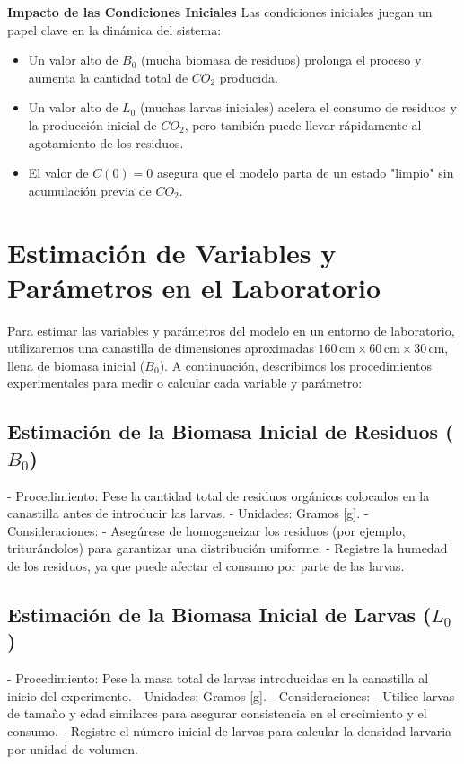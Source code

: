 \documentclass[12pt]{article}
\begin{document}
\textbf{Impacto de las Condiciones Iniciales}
Las condiciones iniciales juegan un papel clave en la dinámica del sistema:
\begin{itemize}
    \item Un valor alto de $B_0$ (mucha biomasa de residuos) prolonga el proceso y aumenta la cantidad total de $CO_2$ producida.
    \item Un valor alto de $L_0$ (muchas larvas iniciales) acelera el consumo de residuos y la producción inicial de $CO_2$, pero también puede llevar rápidamente al agotamiento de los residuos.
    \item El valor de $C(0) = 0$ asegura que el modelo parta de un estado "limpio" sin acumulación previa de $CO_2$.
\end{itemize}

\section{Estimación de Variables y Parámetros en el Laboratorio}

Para estimar las variables y parámetros del modelo en un entorno de laboratorio, utilizaremos una canastilla de dimensiones aproximadas $160 \, \text{cm} \times 60 \, \text{cm} \times 30 \, \text{cm}$, llena de biomasa inicial ($B_0$). A continuación, describimos los procedimientos experimentales para medir o calcular cada variable y parámetro:

\subsection{Estimación de la Biomasa Inicial de Residuos ($B_0$)}
- Procedimiento: Pese la cantidad total de residuos orgánicos colocados en la canastilla antes de introducir las larvas.
- Unidades: Gramos [g].
- Consideraciones:
  - Asegúrese de homogeneizar los residuos (por ejemplo, triturándolos) para garantizar una distribución uniforme.
  - Registre la humedad de los residuos, ya que puede afectar el consumo por parte de las larvas.

\subsection{Estimación de la Biomasa Inicial de Larvas ($L_0$)}
- Procedimiento: Pese la masa total de larvas introducidas en la canastilla al inicio del experimento.
- Unidades: Gramos [g].
- Consideraciones:
  - Utilice larvas de tamaño y edad similares para asegurar consistencia en el crecimiento y el consumo.
  - Registre el número inicial de larvas para calcular la densidad larvaria por unidad de volumen.
\end{document}
